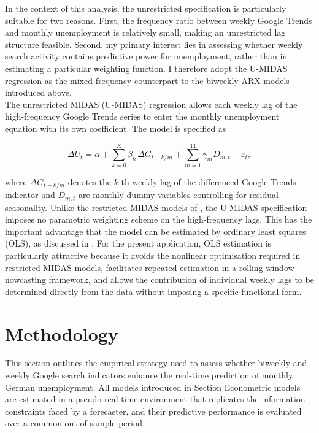 \documentclass[12pt,a4paper]{article}
\begin{document}
In the context of this analysis, the unrestricted specification is particularly suitable for two reasons. First, the frequency ratio between weekly Google Trends and monthly unemployment is relatively small, making an unrestricted lag structure feasible. Second, my primary interest lies in assessing whether weekly search activity contains predictive power for unemployment, rather than in estimating a particular weighting function. I therefore adopt the U-MIDAS regression as the mixed-frequency counterpart to the biweekly ARX models introduced above.\\
The unrestricted MIDAS (U-MIDAS) regression allows each weekly lag of the 
high-frequency Google Trends series to enter the monthly unemployment equation 
with its own coefficient. The model is specified as

\begin{equation}
    \Delta U_t 
    = \alpha
    + \sum_{k=0}^{K} \beta_{k}\,\Delta G_{t-k/m}
    + \sum_{m=1}^{11} \gamma_m D_{m,t}
    + \varepsilon_t,
    \label{eq:umidas}
\end{equation}

where $\Delta G_{t-k/m}$ denotes the $k$-th weekly lag of the differenced Google 
Trends indicator and $D_{m,t}$ are monthly dummy variables controlling for 
residual seasonality. Unlike the restricted MIDAS models of 
\citet{ghysels, ghysel2}, the U-MIDAS specification imposes no 
parametric weighting scheme on the high-frequency lags. This has the important 
advantage that the model can be estimated by ordinary least squares (OLS), as 
discussed in \citet{foroni}. For the present application, OLS estimation is 
particularly attractive because it avoids the nonlinear optimisation required in 
restricted MIDAS models, facilitates repeated estimation in a rolling-window 
nowcasting framework, and allows the contribution of individual weekly lags to be 
determined directly from the data without imposing a specific functional form.

\section{Methodology}
This section outlines the empirical strategy used to assess whether biweekly and
weekly Google search indicators enhance the real-time prediction of monthly
German unemployment. All models introduced in Section Econometric models are
estimated in a pseudo-real-time environment that replicates the information
constraints faced by a forecaster, and their predictive performance is evaluated
over a common out-of-sample period.
\end{document}
